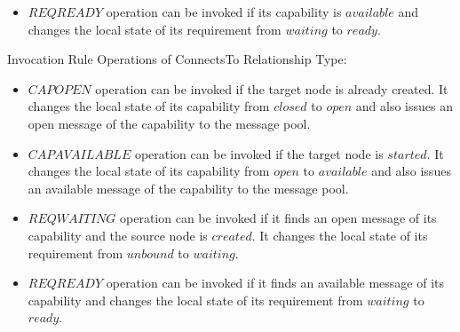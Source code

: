 \documentclass[12pt]{report}
\begin{document}
\begin{description}
\begin{itemize}
  \item $REQREADY$ operation can be invoked if its capability is
    $available$ and changes the local state of its requirement from
    $waiting$ to $ready$.
  \end{itemize}
\item[] Invocation Rule Operations of ConnectsTo Relationship Type:
  \begin{itemize}
  \item $CAPOPEN$ operation can be invoked if the target node is
    already created. It changes the local state of its capability from
    $closed$ to $open$ and also issues an open message of the
    capability to the message pool.
  \item $CAPAVAILABLE$ operation can be invoked if the target node is
    $started$. It changes the local state of its capability from $open$ to
    $available$ and also issues an available message of the capability
    to the message pool.
  \item $REQWAITING$ operation can be invoked if it finds an open
    message of its capability and the source node is $created$. It
    changes the local state of its requirement from $unbound$ to $waiting$.
  \item $REQREADY$ operation can be invoked if it finds an available
    message of its capability and changes the local state of its requirement from
    $waiting$ to $ready$.
  \end{itemize}
\end{description}

\end{document}
